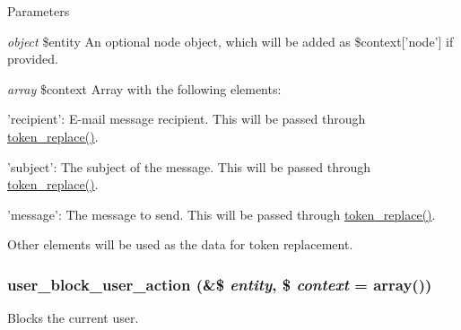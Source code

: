 \begin{DoxyParams}{Parameters}
\item[{\em object}]\$entity An optional node object, which will be added as \$context\mbox{[}'node'\mbox{]} if provided. \item[{\em array}]\$context Array with the following elements:
\begin{DoxyItemize}
\item 'recipient': E-\/mail message recipient. This will be passed through \hyperlink{includes_2token_8inc_a47eb294b05ca8d04439a9a82ccc4d82a}{token\_\-replace()}.
\item 'subject': The subject of the message. This will be passed through \hyperlink{includes_2token_8inc_a47eb294b05ca8d04439a9a82ccc4d82a}{token\_\-replace()}.
\item 'message': The message to send. This will be passed through \hyperlink{includes_2token_8inc_a47eb294b05ca8d04439a9a82ccc4d82a}{token\_\-replace()}.
\item Other elements will be used as the data for token replacement. 
\end{DoxyItemize}\end{DoxyParams}
\hypertarget{group__actions_gaaebd8bde2e44d7b334ba57e716fce110}{
\subsubsection[{user\_\-block\_\-user\_\-action}]{\setlength{\rightskip}{0pt plus 5cm}user\_\-block\_\-user\_\-action (\&\$ {\em entity}, \/  \$ {\em context} = {\ttfamily array()})}}
\label{group__actions_gaaebd8bde2e44d7b334ba57e716fce110}
Blocks the current user. 